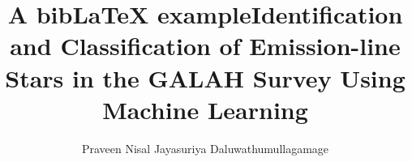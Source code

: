\documentclass[mres, copyrightpage, examinerscopy]{mqthesis}
\title{A bibLaTeX example}
\begin{document}
\frontmatter

\title{Identification and Classification of Emission-line Stars in the GALAH Survey Using Machine Learning}
\author{Praveen Nisal Jayasuriya Daluwathumullagamage}

\titlepage


%


\tableofcontents
\listoffigures
\listoftables

\mainmatter

















\appendix






\backmatter

%




\printbibliography
\end{document}
